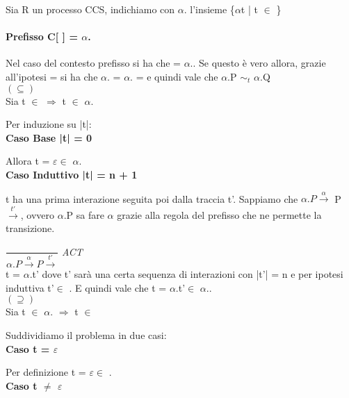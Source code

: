 Sia R un processo CCS, indichiamo con $\alpha$. l'insieme \{$\alpha$t | t $\in$ \}

\paragraph{Prefisso C[ ] = $\alpha$.} \mbox{}

Nel caso del contesto prefisso si ha che  = $\alpha$..
Se questo è vero allora, grazie all'ipotesi  =  si ha che  $\alpha$. =  $\alpha$. =  e quindi vale che $\alpha$.P $\sim_{t}$ $\alpha$.Q\\

$(\subseteq)$ \\

Sia  t $\in$  $\Rightarrow$  t $\in$ $\alpha$.

Per induzione su |t|:
\\

\textbf{Caso Base |t| = 0}

Allora t = $\varepsilon \in$ $ \alpha$.
\\

\textbf{Caso Induttivo |t| = n + 1}

t ha una prima interazione seguita poi dalla traccia t'. Sappiamo che $\alpha.P\overset{\alpha}\rightarrow $ P $\overset{t'}\rightarrow$, ovvero $\alpha$.P sa fare $\alpha$ grazie alla regola del prefisso che ne permette la transizione.

	$\dfrac{}{\alpha.P \overset{\alpha}\rightarrow P\overset{t'}\rightarrow}$ \textit{ACT} \\
	
t = $\alpha$.t' dove t' sarà una certa sequenza di interazioni con |t'| = n e per ipotesi induttiva t'$\in$ . E quindi vale che t = $\alpha$.t'$\in$ $\alpha$..\\

$(\supseteq)$ \\

Sia  t $\in$ $\alpha$. $\Rightarrow$  t $\in$ 

Suddividiamo il problema in due casi:
\\

\textbf{Caso t = $\varepsilon$}

Per definizione t = $\varepsilon \in $ .
\\
 
\textbf{Caso t $\not=$ $\varepsilon$}

